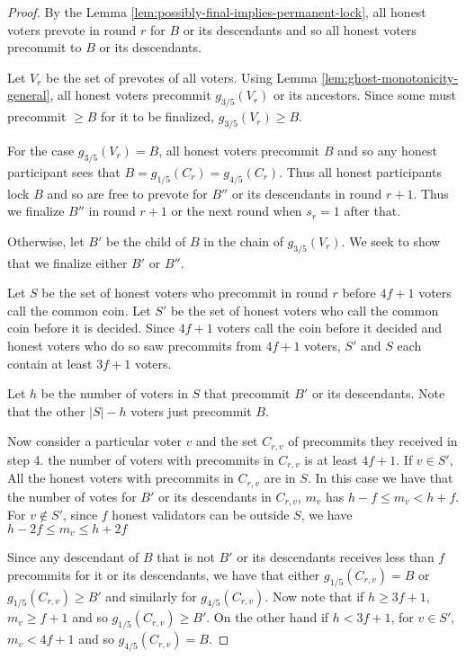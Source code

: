 \documentclass[a4paper,UKenglish,cleveref, autoref, thm-restate, anonymous]{lipics-v2019}
\begin{document}
{\begin{proof} By the Lemma \ref{lem:possibly-final-implies-permanent-lock}, all honest voters prevote in round $r$ for $B$ or its descendants and so all honest voters precommit to $B$ or its descendants.

Let $V_r$ be the set of prevotes of all voters.  Using Lemma \ref{lem:ghost-monotonicity-general}, all honest voters precommit $g_{3/5}(V_r)$ or its ancestors. Since some must precommit $\geq B$ for it to be finalized,  $g_{3/5}(V_r) \geq B$.

For the case $g_{3/5}(V_r)=B$, all honest voters precommit $B$ and so any honest participant sees that
$B = g_{1/5}(C_r) = g_{4/5}(C_r)$. Thus all honest participants
lock $B$ and so are free to prevote for $B''$ or its descendants in round $r+1$. Thus we finalize $B''$ in round $r+1$ or the next round when $s_r=1$ after that.

Otherwise, let $B'$ be the child of $B$ in the chain of $g_{3/5}(V_r)$. We seek to show that we finalize either $B'$ or $B''$.

Let $S$ be the set of honest voters who precommit in round $r$ before $4f+1$ voters call the common coin. Let $S'$ be the set of honest voters who call the common coin before it is decided. %
Since $4f+1$  voters call the coin before it decided and honest voters who do so saw precommits from $4f+1$ voters, $S'$ and $S$ each contain at least $3f+1$ voters.

Let $h$ be the number of voters in $S$ that precommit $B'$ or its descendants. Note that the other $|S|-h$ voters just precommit $B$.

Now consider a particular voter $v$ and the set $C_{r,v}$ of precommits they received in step 4. the number of voters with precommits in  $C_{r,v}$ is at least $4f+1$. 
If $v \in S'$,
All the honest voters  
with precommits in $C_{r,v}$ are in $S$. In this case we have that the number of votes for $B'$ or its descendants in $C_{r,v}$, $m_v$ has $h-f \leq m_v < h+f$. For $v \notin S'$, since $f$ honest validators can be outside $S$, we have $h-2f \leq m_v \leq h+2f$ 

Since any descendant of $B$ that is not $B'$ or its descendants receives less than $f$ precommits for it or its descendants, we have that either $g_{1/5}(C_{r,v})=B$ or $g_{1/5}(C_{r,v})\geq B'$ and similarly for $g_{4/5}(C_{r,v})$. Now note that if $h \geq 3f+1$, $m_v \geq f+1$ and so $g_{1/5}(C_{r,v}) \geq B'$. On the other hand if $h < 3f+1$, for $v \in S'$, $m_v < 4f+1$ and so $g_{4/5}(C_{r,v})=B$.


\end{proof}}
\end{document}
